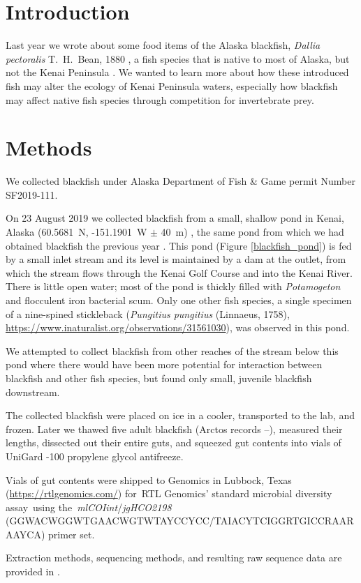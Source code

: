 \begin{multicols}{2}   

\section{Introduction}

Last year we  wrote about some food items of the Alaska blackfish, \textit{Dallia pectoralis} T.\ H.\ Bean, 1880 \citep{Bowseretal2019},  a fish species that is native to most of Alaska, but not the Kenai Peninsula \citep{Eidametal2016, Bowser2018}. We wanted to learn more about how these introduced fish may alter the ecology of Kenai Peninsula waters, especially how blackfish may affect native fish species through competition for invertebrate prey.

\section{Methods}

We collected blackfish under Alaska Department of Fish \& Game permit Number SF2019-111.

On 23 August 2019 we collected blackfish from a small, shallow pond in Kenai, Alaska (60.5681~\textdegree{}N, -151.1901~\textdegree{}W $\pm$ 40~m) \citep{bowser2019}, the same pond from which we had obtained blackfish the previous year \citep{Bowseretal2019}. This pond (Figure \ref{blackfish_pond}) is fed by a small inlet stream and its level is maintained by a dam at the outlet, from which the stream flows through the Kenai Golf Course and into the Kenai River. There is little open water; most of the pond is thickly filled with \textit{Potamogeton} and flocculent iron bacterial scum. Only one other fish species, a single specimen of a nine-spined stickleback (\textit{Pungitius pungitius} (Linnaeus, 1758),  
\url{https://www.inaturalist.org/observations/31561030}), was observed in this pond.

We attempted to collect blackfish from other reaches of the stream below this pond where there would have been more potential for interaction between blackfish and other fish species, but found only small, juvenile blackfish downstream. 

The collected blackfish were placed on ice in a cooler, transported to the lab, and frozen. Later we thawed five adult blackfish (Arctos records --), measured their lengths, dissected out their entire guts, and squeezed gut contents into vials of UniGard -100 propylene glycol antifreeze.

Vials of gut contents were shipped to  Genomics in Lubbock, Texas (\url{https://rtlgenomics.com/}) for RTL Genomics' standard microbial diversity assay using the \textit{mlCOIint}/\textit{jgHCO2198} (GGWACWGGWTGAACWGTWTAYCCYCC/TAIACYTCIGGRTGICCRAARAAYCA) primer set.

Extraction methods, sequencing methods, and resulting raw sequence data are provided in \citet{BowserBowser2020}.

\end{multicols}
